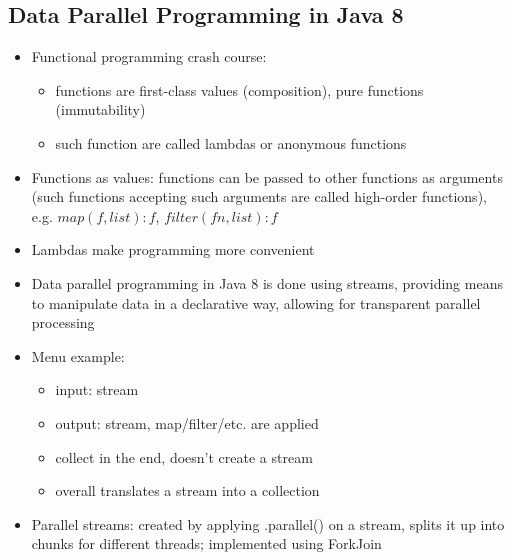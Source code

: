 \documentclass[a4paper]{article}
\begin{document}
\subsection{Data Parallel Programming in Java 8}
\begin{itemize}
\item Functional programming crash course: 
\begin{itemize}
\item functions are first-class values (composition), pure functions (immutability)
\item such function are called lambdas or anonymous functions
\end{itemize}
\item Functions as values: functions can be passed to other functions as arguments (such functions accepting such arguments are called high-order functions), e.g. $map(f,list):f$, $filter(fn,list):f$
\item Lambdas make programming more convenient
\item Data parallel programming in Java 8 is done using streams, providing means to manipulate data in a declarative way, allowing for transparent parallel processing
\item Menu example: 
\begin{itemize}
\item input: stream
\item output: stream, map/filter/etc. are applied
\item collect in the end, doesn't create a stream
\item overall translates a stream into a collection
\end{itemize}
\item Parallel streams: created by applying .parallel() on a stream, splits it up into chunks for different threads; implemented using ForkJoin
\end{itemize}
\end{document}
